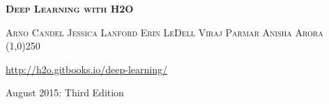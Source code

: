









%

\thispagestyle{empty} %

\begin{center}
\textsc{\Large\bf{Deep Learning with H2O}}


\bigskip
\textsc{\small{Arno Candel \hspace{20pt} Jessica Lanford \hspace{20pt} Erin LeDell \hspace{20pt} Viraj Parmar \hspace{20pt} Anisha Arora } }
\\
\bigskip
\line(1,0){250}  %

{\url{http://h2o.gitbooks.io/deep-learning/}}


\bigskip
August 2015: Third Edition 
\\%
\bigskip
\end{center}

